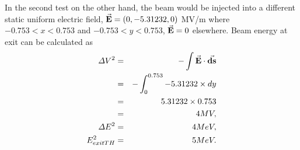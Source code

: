 \documentclass[a4paper,oneside,12pt]{report}
\numberwithin{equation}{chapter}
\begin{document}
{\vspace{-15pt}
In the second test on the other hand, the beam would be injected into a different static uniform electric field,
$\vec{\textbf{E}}=(0, -5.31232, 0)$ MV/m where $-0.753<x<0.753$ and $-0.753<y<0.753$, $\vec{\textbf{E}}=0$ elsewhere.
Beam energy at exit can be calculated as
\vspace{-10pt}\begin{eqnarray}
    \Delta V^2   &=& - \int \vec{\textbf{E}} \cdot \vec{\textbf{ds}} \nonumber \\
                 &=& - \int_{0}^{0.753} -5.31232 \times dy \nonumber \\
                 &=& 5.31232 \times 0.753 \nonumber \\
                 &=& 4 MV, \\
    \Delta E^2   &=& 4 MeV, \\
    E_{exitTH}^2 &=& 5 MeV.
\end{eqnarray}

}
\end{document}
